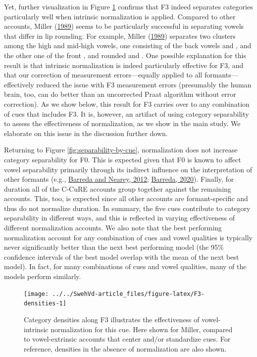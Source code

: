 \documentclass[utf8]{frontiers_suppmat} %
\begin{document}
Yet, further visualization in Figure \ref{fig:F3-densities} confirms that F3 indeed separates categories particularly well when intrinsic normalization is applied. Compared to other accounts, Miller (\protect\hyperlink{ref-miller1989c}{1989}) seems to be particularly successful in separating vowels that differ in lip rounding. For example, Miller (\protect\hyperlink{ref-miller1989c}{1989}) separates two clusters among the high and mid-high vowels, one consisting of the back vowels \ipatext{[oː]} and \ipatext{[uː]}, and the other one of the front \ipatext{[iː]}, and rounded \ipatext{[yː]} and \ipatext{[ʉː]}. One possible explanation for this result is that intrinsic normalization is indeed particularly effective for F3, and that our correction of measurement errors---equally applied to all formants---effectively reduced the issue with F3 measurement errors (presumably the human brain, too, can do better than an uncorrected Praat algorithm without error correction). As we show below, this result for F3 carries over to any combination of cues that includes F3. It is, however, an artifact of using category separability to assess the effectiveness of normalization, as we show in the main study. We elaborate on this issue in the discussion further down.

Returning to Figure \ref{fig:separability-by-cue}, normalization does not increase category separability for F0. This is expected given that F0 is known to affect vowel separability primarily through its indirect influence on the interpretation of other formants (e.g., \protect\hyperlink{ref-barreda2012a}{Barreda and Nearey, 2012}; \protect\hyperlink{ref-barreda2020a}{Barreda, 2020}). Finally, for duration all of the C-CuRE accounts group together against the remaining accounts. This, too, is expected since all other accounts are formant-specific and thus do not normalize duration. In summary, the five cues contribute to category separability in different ways, and this is reflected in varying effectiveness of different normalization accounts. We also note that the best performing normalization account for any combination of cues and vowel qualities is typically never significantly better than the next best performing model (the 95\% confidence intervals of the best model overlap with the mean of the next best model). In fact, for many combinations of cues and vowel qualities, many of the models perform similarly.



\begin{figure}

{\centering \texttt{[image: ../../SwehVd-article\_files/figure-latex/F3-densities-1]} 

}

\caption{Category densities along F3 illustrates the effectiveness of vowel-intrinsic normalization for this cue. Here shown for Miller, compared to vowel-extrinsic accounts that center and/or standardize cues. For reference, densities in the absence of normalization are also shown.}\label{fig:F3-densities}
\end{figure}
\end{document}
